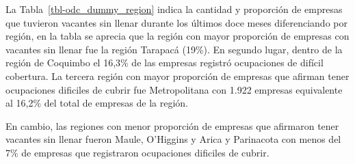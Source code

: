 \documentclass[
  11pt,
]{article}
\begin{document}
La Tabla~\ref{tbl-odc_dummy_region} indica la cantidad y proporción de
empresas que tuvieron vacantes sin llenar durante los últimos doce meses
diferenciando por región, en la tabla se aprecia que la región con mayor
proporción de empresas con vacantes sin llenar fue la región Tarapacá
(19\%). En segundo lugar, dentro de la región de Coquimbo el 16,3\% de
las empresas registró ocupaciones de difícil cobertura. La tercera
región con mayor proporción de empresas que afirman tener ocupaciones
dificiles de cubrir fue Metropolitana con 1.922 empresas equivalente al
16,2\% del total de empresas de la región.

En cambio, las regiones con menor proporción de empresas que afirmaron
tener vacantes sin llenar fueron Maule, O'Higgins y Arica y Parinacota
con menos del 7\% de empresas que registraron ocupaciones dificiles de
cubrir.
\end{document}
